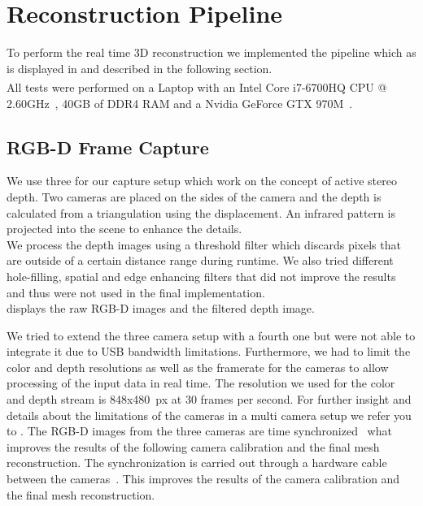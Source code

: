 \documentclass[10pt,twocolumn,letterpaper]{article}
\begin{document}
\section{Reconstruction Pipeline}
\label{sec:reconstruction-pipeline}
To perform the real time 3D reconstruction we implemented the pipeline which as is displayed in  and described in the following section.\\
All tests were performed on a Laptop with an Intel\textsuperscript{\textregistered} Core\texttrademark{} \mbox{i7-6700HQ} CPU @ 2.60GHz~\cite{CPU}, 40GB of DDR4 RAM and a Nvidia GeForce GTX 970M~\cite{GTX970}.

\subsection{RGB-D Frame Capture}
We use three \rscamera{} for our capture setup which work on the concept of active stereo depth. Two cameras are placed on the sides of the camera and the depth is calculated from a triangulation using the displacement. An infrared pattern is projected into the scene to enhance the details.\\
We process the depth images using a threshold filter which discards pixels that are outside of a certain distance range during runtime. We also tried different hole-filling, spatial and edge enhancing filters that did not improve the results and thus were not used in the final implementation.\\
 displays the raw RGB-D images and the filtered depth image.

We tried to extend the three camera setup with a fourth one but were not able to integrate it due to USB bandwidth limitations. Furthermore, we had to limit the color and depth resolutions as well as the framerate for the cameras to allow processing of the input data in real time. The resolution we used for the color and depth stream is 848x480~px at 30 frames per second. For further insight and details about the limitations of the cameras in a multi camera setup we refer you to \cite{RealSenseWhitepaper}.
\newpage
The RGB-D images from the three cameras are time synchronized~\cite{RealSenseWhitepaper} what improves the results of the following camera calibration and the final mesh reconstruction.
The synchronization is carried out through a hardware cable between the cameras~\cite{RealSenseWhitepaper}. This improves the results of the camera calibration and the final mesh reconstruction.
\end{document}
